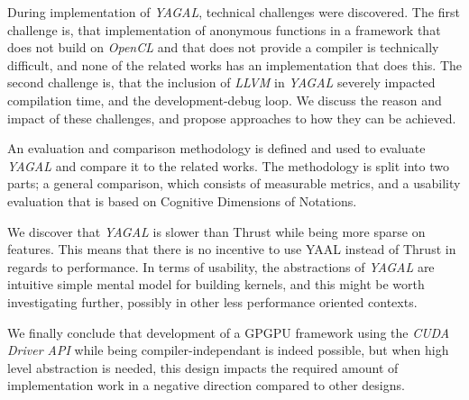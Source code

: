 During implementation of \textit{YAGAL}, technical challenges were discovered. The first challenge is, that implementation of anonymous functions in a framework that does not build on \textit{OpenCL} and that does not provide a compiler is technically difficult, and none of the related works has an implementation that does this. The second challenge is, that the inclusion of \textit{LLVM} in \textit{YAGAL} severely impacted compilation time, and the development-debug loop. We discuss the reason and impact of these challenges, and propose approaches to how they can be achieved.

An evaluation and comparison methodology is defined and used to evaluate \textit{YAGAL} and compare it to the related works. The methodology is split into two parts; a general comparison, which consists of  measurable metrics, and a usability evaluation that is based on Cognitive Dimensions of Notations. 

We discover that \textit{YAGAL} is slower than Thrust while being more sparse on features. This means that there is no incentive to use YAAL instead of Thrust in regards to performance. In terms of usability, the abstractions of \textit{YAGAL} are intuitive simple mental model for building kernels, and this might be worth investigating further, possibly in other less performance oriented contexts.

We finally conclude that development of a GPGPU framework using the \textit{CUDA Driver API} while being compiler-independant is indeed possible, but when high level abstraction is needed, this design impacts the required amount of implementation work in a negative direction compared to other designs. 

